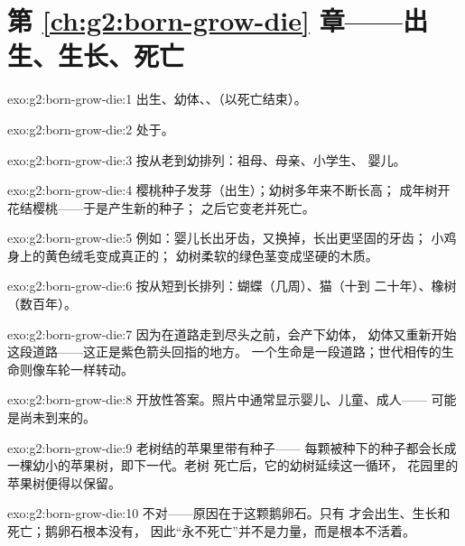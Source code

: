 \section*{第 \ref{ch:g2:born-grow-die} 章——出生、生长、死亡}

\begin{solution}{exo:g2:born-grow-die:1}
出生、幼体、、（以死亡结束）。
\end{solution}

\begin{solution}{exo:g2:born-grow-die:2}
处于。
\end{solution}

\begin{solution}{exo:g2:born-grow-die:3}
按从老到幼排列：祖母、母亲、小学生、
婴儿。
\end{solution}

\begin{solution}{exo:g2:born-grow-die:4}
樱桃种子发芽（出生）；幼树多年来不断长高；
成年树开花结樱桃——于是产生新的种子；
之后它变老并死亡。
\end{solution}

\begin{solution}{exo:g2:born-grow-die:5}
例如：婴儿长出牙齿，又换掉，长出更坚固的牙齿；
小鸡身上的黄色绒毛变成真正的；
幼树柔软的绿色茎变成坚硬的木质。
\end{solution}

\begin{solution}{exo:g2:born-grow-die:6}
按从短到长排列：蝴蝶（几周）、猫（十到
二十年）、橡树（数百年）。
\end{solution}

\begin{solution}{exo:g2:born-grow-die:7}
因为在道路走到尽头之前，会产下幼体，
幼体又重新开始这段道路——这正是紫色箭头回指的地方。
一个生命是一段道路；世代相传的生命则像车轮一样转动。
\end{solution}

\begin{solution}{exo:g2:born-grow-die:8}
开放性答案。照片中通常显示婴儿、儿童、成人——
可能是尚未到来的。
\end{solution}

\begin{solution}{exo:g2:born-grow-die:9}
老树结的苹果里带有种子——
每颗被种下的种子都会长成一棵幼小的苹果树，即下一代。老树
死亡后，它的幼树延续这一循环，
花园里的苹果树便得以保留。
\end{solution}

\begin{solution}{exo:g2:born-grow-die:10}
不对——原因在于这颗鹅卵石。只有
才会出生、生长和死亡；鹅卵石根本没有，
因此“永不死亡”并不是力量，而是根本不活着。
\end{solution}

